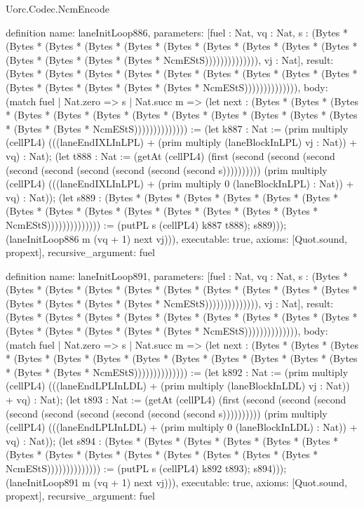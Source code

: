 \begin{lexlean}{Uorc.Codec.NcmEncode}
\begin{semanticmodule}
definition{
  name: laneInitLoop886,
  parameters: [fuel : Nat, vq : Nat, s : (Bytes * (Bytes * (Bytes * (Bytes * (Bytes * (Bytes * (Bytes * (Bytes * (Bytes * (Bytes * (Bytes * (Bytes * (Bytes * (Bytes * NcmEStS)))))))))))))), vj : Nat],
  result: (Bytes * (Bytes * (Bytes * (Bytes * (Bytes * (Bytes * (Bytes * (Bytes * (Bytes * (Bytes * (Bytes * (Bytes * (Bytes * (Bytes * NcmEStS)))))))))))))),
  body: (match fuel
    | Nat.zero => s
    | Nat.succ m => (let next : (Bytes * (Bytes * (Bytes * (Bytes * (Bytes * (Bytes * (Bytes * (Bytes * (Bytes * (Bytes * (Bytes * (Bytes * (Bytes * (Bytes * NcmEStS)))))))))))))) := (let k887 : Nat := (prim multiply (cellPL4) (((laneEndIXLInLPL) + (prim multiply (laneBlockInLPL) vj : Nat)) + vq) : Nat); (let t888 : Nat := (getAt (cellPL4) (first (second (second (second (second (second (second (second (second (second s)))))))))) (prim multiply (cellPL4) (((laneEndIXLInLPL) + (prim multiply 0 (laneBlockInLPL) : Nat)) + vq) : Nat)); (let s889 : (Bytes * (Bytes * (Bytes * (Bytes * (Bytes * (Bytes * (Bytes * (Bytes * (Bytes * (Bytes * (Bytes * (Bytes * (Bytes * (Bytes * NcmEStS)))))))))))))) := (putPL s (cellPL4) k887 t888); s889))); (laneInitLoop886 m (vq + 1) next vj))),
  executable: true,
  axioms: [Quot.sound, propext],
  recursive_argument: fuel
}

definition{
  name: laneInitLoop891,
  parameters: [fuel : Nat, vq : Nat, s : (Bytes * (Bytes * (Bytes * (Bytes * (Bytes * (Bytes * (Bytes * (Bytes * (Bytes * (Bytes * (Bytes * (Bytes * (Bytes * (Bytes * NcmEStS)))))))))))))), vj : Nat],
  result: (Bytes * (Bytes * (Bytes * (Bytes * (Bytes * (Bytes * (Bytes * (Bytes * (Bytes * (Bytes * (Bytes * (Bytes * (Bytes * (Bytes * NcmEStS)))))))))))))),
  body: (match fuel
    | Nat.zero => s
    | Nat.succ m => (let next : (Bytes * (Bytes * (Bytes * (Bytes * (Bytes * (Bytes * (Bytes * (Bytes * (Bytes * (Bytes * (Bytes * (Bytes * (Bytes * (Bytes * NcmEStS)))))))))))))) := (let k892 : Nat := (prim multiply (cellPL4) (((laneEndLPLInLDL) + (prim multiply (laneBlockInLDL) vj : Nat)) + vq) : Nat); (let t893 : Nat := (getAt (cellPL4) (first (second (second (second (second (second (second (second (second (second s)))))))))) (prim multiply (cellPL4) (((laneEndLPLInLDL) + (prim multiply 0 (laneBlockInLDL) : Nat)) + vq) : Nat)); (let s894 : (Bytes * (Bytes * (Bytes * (Bytes * (Bytes * (Bytes * (Bytes * (Bytes * (Bytes * (Bytes * (Bytes * (Bytes * (Bytes * (Bytes * NcmEStS)))))))))))))) := (putPL s (cellPL4) k892 t893); s894))); (laneInitLoop891 m (vq + 1) next vj))),
  executable: true,
  axioms: [Quot.sound, propext],
  recursive_argument: fuel
}


\end{semanticmodule}
\end{lexlean}
